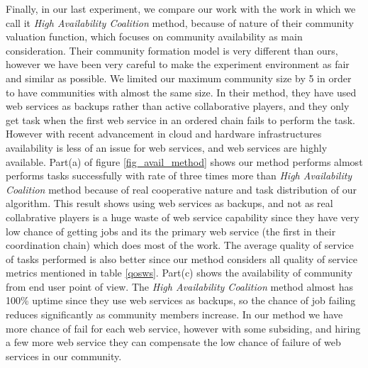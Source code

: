 Finally, in our last experiment, we compare our work with the work in \cite{10.1109/TSC.2012.12} which we call it \emph{High Availability Coalition} method, because of nature of their community valuation function, which focuses on community availability as main consideration. Their community formation model is very different than ours, however we have been very careful to make the experiment environment as fair and similar as possible. We limited our maximum community size by 5 in order to have communities with almost the same size. In their method, they have used web services as backups rather than active collaborative players, and they only get task when the first web service in an ordered chain fails to perform the task. However with recent advancement in cloud and hardware infrastructures availability is less of an issue for web services, and web services are highly available. Part(a) of figure \ref{fig_avail_method} shows our method performs almost performs tasks successfully with rate of three times more than \emph{High Availability Coalition} method because of real cooperative nature and task distribution of our algorithm. This result shows using web services as backups, and not as real collabrative players is a huge waste of web service capability since they have very low chance of getting jobs and its the primary web service (the first in their coordination chain) which does most of the work. The average quality of service of tasks performed is also better since our method considers all quality of service metrics mentioned in table \ref{qosws}. Part(c) shows the availability of community from end user point of view. The \emph {High Availability Coalition} method almost has 100\% uptime since they use web services as backups, so the chance of job failing reduces significantly as community members increase. In our method we have more chance of fail for each web service, however with some subsiding, and hiring a few more web service they can compensate the low chance of failure of web services in our community.
